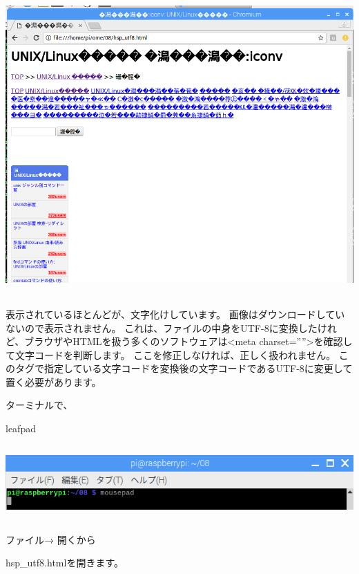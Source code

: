 \documentclass[a4paper,12pt,dvipdfmx]{jarticle}
\begin{document}
\begin{center}
\includegraphics[width=16.113cm,height=11.518cm]{textbook-img024.png}

\end{center}
表示されているほとんどが、文字化けしています。
画像はダウンロードしていないので表示されません。
これは、ファイルの中身をUTF-8に変換したけれど、ブラウザやHTMLを扱う多くのソフトウェアは{\textless}meta
charset=””{\textgreater}を確認して文字コードを判断します。
ここを修正しなければ、正しく扱われません。
このタグで指定している文字コードを変換後の文字コードであるUTF-8に変更して置く必要があります。


ターミナルで、

leafpad



\begin{center}
\includegraphics[width=17.006cm,height=2.87cm]{textbook-img006.png}

\end{center}
\clearpage
ファイル→ 開くから

hsp\_utf8.htmlを開きます。
\end{document}
